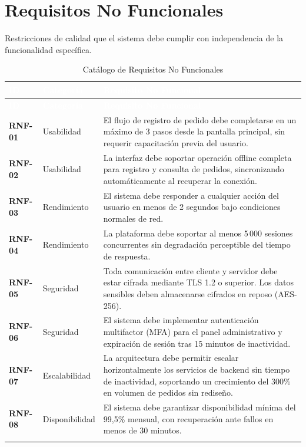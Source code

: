 \documentclass[12pt, a4paper]{report}
\begin{document}
\section{Requisitos No Funcionales}

Restricciones de calidad que el sistema debe cumplir con independencia de la funcionalidad específica.

\begin{longtable}{>{\bfseries\color{utplblue}}p{1.8cm} p{2.8cm} p{9cm}}
\toprule
\rowcolor{utplblue}
\textcolor{white}{\textbf{ID}} &
\textcolor{white}{\textbf{Categoría}} &
\textcolor{white}{\textbf{Requisito No Funcional}} \\
\midrule
\endfirsthead
\toprule
\rowcolor{utplblue}
\textcolor{white}{\textbf{ID}} &
\textcolor{white}{\textbf{Categoría}} &
\textcolor{white}{\textbf{Requisito No Funcional}} \\
\midrule
\endhead
\rowcolor{lightgray}
RNF-01 & Usabilidad & El flujo de registro de pedido debe completarse en un máximo de 3 pasos desde la pantalla principal, sin requerir capacitación previa del usuario. \\
\rowcolor{white}
RNF-02 & Usabilidad & La interfaz debe soportar operación offline completa para registro y consulta de pedidos, sincronizando automáticamente al recuperar la conexión. \\
\rowcolor{lightgray}
RNF-03 & Rendimiento & El sistema debe responder a cualquier acción del usuario en menos de 2 segundos bajo condiciones normales de red. \\
\rowcolor{white}
RNF-04 & Rendimiento & La plataforma debe soportar al menos 5\,000 sesiones concurrentes sin degradación perceptible del tiempo de respuesta. \\
\rowcolor{lightgray}
RNF-05 & Seguridad & Toda comunicación entre cliente y servidor debe estar cifrada mediante TLS 1.2 o superior. Los datos sensibles deben almacenarse cifrados en reposo (AES-256). \\
\rowcolor{white}
RNF-06 & Seguridad & El sistema debe implementar autenticación multifactor (MFA) para el panel administrativo y expiración de sesión tras 15 minutos de inactividad. \\
\rowcolor{lightgray}
RNF-07 & Escalabilidad & La arquitectura debe permitir escalar horizontalmente los servicios de backend sin tiempo de inactividad, soportando un crecimiento del 300\% en volumen de pedidos sin rediseño. \\
\rowcolor{white}
RNF-08 & Disponibilidad & El sistema debe garantizar disponibilidad mínima del 99,5\% mensual, con recuperación ante fallos en menos de 30 minutos. \\
\bottomrule
\caption{Catálogo de Requisitos No Funcionales}
\end{longtable}
\end{document}
